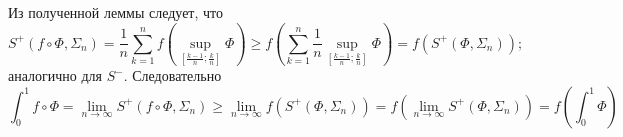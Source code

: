 \documentclass[12pt,a4paper]{article}
\begin{document}
\begin{enumproblem}
\begin{enumerate}
            Из полученной леммы следует, что
            \[
                S^+(f \circ \Phi, \Sigma_n)
                = \frac{1}{n} \sum_{k=1}^n f\left(\sup_{\left[\frac{k-1}{n}; \frac{k}{n}\right]} \Phi\right)
                \geqslant f\left(\sum_{k=1}^n \frac{1}{n} \sup_{\left[\frac{k-1}{n}; \frac{k}{n}\right]} \Phi\right)
                = f(S^+(\Phi, \Sigma_n));
            \]
            аналогично для $S^-$. Следовательно
            \[
                \int_0^1 f \circ \Phi
                = \lim_{n \to \infty} S^+(f \circ \Phi, \Sigma_n)
                \geqslant \lim_{n \to \infty} f(S^+(\Phi, \Sigma_n))
                = f\left(\lim_{n \to \infty} S^+(\Phi, \Sigma_n)\right)
                = f\left(\int_0^1 \Phi\right)
            \]
        \end{enumerate}
    \end{enumproblem}
\end{document}
